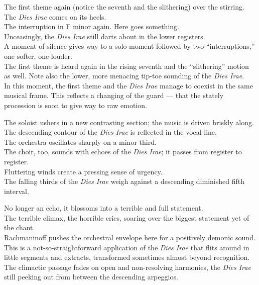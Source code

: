\documentclass{beamer}
\begin{document}
\begin{frame} 
  The first theme again (notice the seventh and the slithering) over the stirring. \pause The \textit{Dies Irae} comes on its heels. 
  \pause \\ 
  The interruption in F minor again. Here goes something. 
  \pause \\ 
  Unceasingly, the \textit{Dies Irae} still darts about in the lower registers. 
  \pause \\ 
  A moment of silence gives way to a solo moment followed by two ``interruptions,'' one softer, one louder. 
  \pause \\ 
  The first theme is heard again in the rising seventh and the ``slithering'' motion as well. Note also the lower, more menacing tip-toe sounding of the \textit{Dies Irae}. 
  \pause \\ 
  In this moment, the first theme and the \textit{Dies Irae} manage to coexist in the same musical frame. This reflects a changing of the guard --- that the stately procession is soon to give way to raw emotion. 
\end{frame} 

\begin{frame}
  The soloist ushers in a new contrasting section; the music is driven briskly along. 
  \pause \\ 
  The descending contour of the \textit{Dies Irae} is reflected in the vocal line. 
  \pause \\
  The orchestra oscillates sharply on a minor third. 
  \pause \\ 
  The choir, too, sounds with echoes of the \textit{Dies Irae}; it passes from register to register. 
  \pause \\
  Fluttering winds create a pressing sense of urgency. 
  \pause \\ 
  The falling thirds of the \textit{Dies Irae} weigh against a descending diminished fifth interval. 
\end{frame} 

\begin{frame}
  No longer an echo, it blossoms into a terrible and full statement. 
  \pause \\ 
  The terrible climax, the horrible cries, soaring over the biggest statement yet of the chant. 
  \pause \\ 
  Rachmaninoff pushes the orchestral envelope here for a positively demonic sound. 
  \pause \\ 
  This is a not-so-straightforward application of the \textit{Dies Irae} that flits around in little segments and extracts, transformed sometimes almost beyond recognition. 
  \pause \\ 
  The climactic passage fades on open and non-resolving harmonies, the \textit{Dies Irae} still peeking out from between the descending arpeggios. 
\end{frame} 
\end{document}
